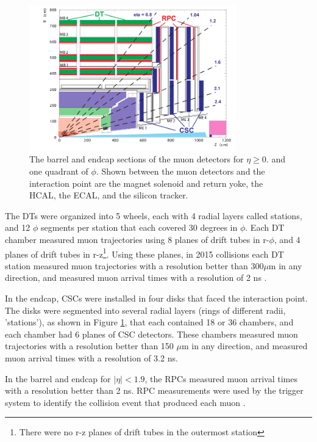 \begin{figure}[ht]
	\centering
	\includegraphics[width=0.8\textwidth]{figures/muonDetectorLayout.png}
	\caption{The barrel and endcap sections of the muon detectors for $\eta \geq 0.$ and one quadrant of $\phi$.  Shown 
		between the muon detectors and the interaction point are the magnet solenoid and return yoke, the HCAL, the ECAL, 
		and the silicon tracker.}
	\label{fig:muonBarrelAndEndcapDetectors}
\end{figure}

The DTs were organized into 5 wheels, each with 4 radial layers called stations, and 12 $\phi$ segments per 
station that each covered 30 degrees in $\phi$.  Each DT chamber measured muon trajectories using 8 planes of 
drift tubes in r-$\phi$, and 4 planes of drift tubes in r-z\footnote{There were no r-z planes of drift tubes in 
the outermost station}.  Using these planes, in 2015 collisions each DT station measured muon trajectories 
with a resolution better than 300$\mu$m in any direction, and measured muon arrival times with a resolution of 2 ns \cite{cmsMuonRecoRunTwo}.  

In the endcap, CSCs were installed in four disks that faced the interaction point.  
The disks were segmented into several radial layers (rings of different radii, 'stations'), as shown in Figure 
\ref{fig:muonBarrelAndEndcapDetectors}, that each contained 18 or 36 chambers, and each chamber had 6 planes of CSC detectors.  
These chambers measured muon trajectories with a resolution better than 150 $\mu$m in any direction, and measured muon arrival 
times with a resolution of 3.2 ns.

In the barrel and endcap for $|\eta| < 1.9$, the RPCs measured muon arrival times with a resolution better than 
2 ns.  RPC measurements were used by the trigger system to identify the collision event that produced each muon \cite{cmsMuonRecoRunTwo}.

